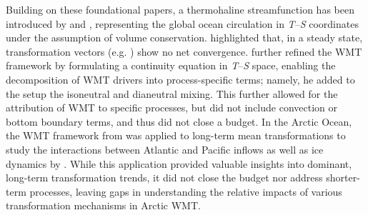\documentclass[draft]{agujournal2019}
\begin{document}
Building on these foundational papers, a thermohaline streamfunction has been introduced by  and , representing the global ocean circulation in \emph{T}--\emph{S} coordinates under the assumption of volume conservation.  highlighted that, in a steady state, transformation vectors (e.g. ) show no net convergence.  further refined the WMT framework by formulating a continuity equation in \emph{T}--\emph{S} space, enabling the decomposition of WMT drivers into process-specific terms; namely, he added to the  setup the isoneutral and dianeutral mixing. This further allowed for the attribution of WMT to specific processes, but did not include convection or bottom boundary terms, and thus did not close a budget. In the Arctic Ocean, the WMT framework from  was applied to long-term mean transformations to study the interactions between Atlantic and Pacific inflows as well as ice dynamics by . While this application provided valuable insights into dominant, long-term transformation trends, it did not close the budget nor address shorter-term processes, leaving gaps in understanding the relative impacts of various transformation mechanisms in Arctic WMT.

\end{document}

